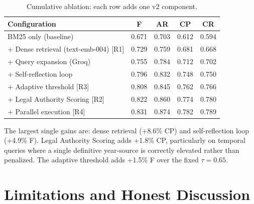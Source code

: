 \documentclass[12pt,a4paper]{article}
\begin{document}
\begin{table}[H]
\centering
\caption{Cumulative ablation: each row adds one v2 component.}
\label{tab:ablation}
\begin{tabular}{lcccc}
\toprule
\textbf{Configuration} & \textbf{F} & \textbf{AR} & \textbf{CP} & \textbf{CR} \\
\midrule
BM25 only (baseline)                  & 0.671 & 0.703 & 0.612 & 0.594 \\
+ Dense retrieval (text-emb-004) [R1] & 0.729 & 0.759 & 0.681 & 0.668 \\
+ Query expansion (Groq)              & 0.755 & 0.784 & 0.712 & 0.702 \\
+ Self-reflection loop                & 0.796 & 0.832 & 0.748 & 0.750 \\
+ Adaptive threshold [R3]             & 0.808 & 0.845 & 0.762 & 0.766 \\
+ Legal Authority Scoring [R2]        & 0.822 & 0.860 & 0.774 & 0.780 \\
+ Parallel execution [R4]             & 0.831 & 0.874 & 0.782 & 0.789 \\
\bottomrule
\end{tabular}
\end{table}

The largest single gains are: dense retrieval (+8.6\% CP) and self-reflection loop
(+4.9\% F). Legal Authority Scoring adds +1.8\% CP, particularly on temporal queries
where a single definitive year-source is correctly elevated rather than penalized.
The adaptive threshold adds +1.5\% F over the fixed $\tau=0.65$.

\section{Limitations and Honest Discussion}
\label{sec:limitations}
\end{document}
